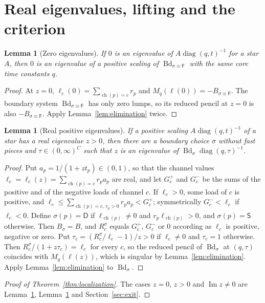 \documentclass[11pt,a4paper]{article}
\theoremstyle{plain}
\newtheorem{lemma}[theorem]{Lemma}
\theoremstyle{definition}
\theoremstyle{remark}
\newcommand{\Imag}{\operatorname{Im}}
\newcommand{\diag}{\operatorname{diag}}
\newcommand{\Bd}{\operatorname{Bd}}
\newcommand{\ch}{\operatorname{ch}}
\newcommand{\rF}{\mathsf{F}}
\newcommand{\rS}{\mathsf{S}}
\newcommand{\rD}{\mathsf{D}}
\begin{document}
\section{Real eigenvalues, lifting and the criterion}\label{sec:proofs}

\begin{lemma}[Zero eigenvalues]\label{lem:zero}
If $0$ is an eigenvalue of $A\diag(q,t)^{-1}$ for a star $A$, then $0$ is an eigenvalue of a
positive scaling of $\Bd_{\sigma\equiv\rF}$ with the same core time constants $q$.
\end{lemma}

\begin{proof}
At $z=0$, $\ell_c(0)=\sum_{\ch(p)=c}r_p$ and $M_q(\ell(0))=-B_{\sigma\equiv\rF}$. The
boundary system $\Bd_{\sigma\equiv\rF}$ has only zero lumps, so its reduced pencil at $z=0$ is
also $-B_{\sigma\equiv\rF}$. Apply Lemma~\ref{lem:elimination} twice.
\end{proof}

\begin{lemma}[Real positive eigenvalues]\label{lem:real}
If a positive scaling $A\diag(q,t)^{-1}$ of a star has a real eigenvalue $z>0$, then there
are a boundary choice $\sigma$ without fast pieces and $\tau\in(0,\infty)^C$ such that $z$ is
an eigenvalue of $\Bd_\sigma\diag(q,\tau)^{-1}$.
\end{lemma}

\begin{proof}
Put $a_p=1/(1+zt_p)\in(0,1)$, so that the channel values
$\ell_c=\ell_c(z)=\sum_{\ch(p)=c}r_pa_p$ are real, and let $G^+_c$ and $G^-_c$ be the sums of
the positive and of the negative loads of channel $c$. If $\ell_c>0$, some load of $c$ is
positive, and $\ell_c\le\sum_{\ch(p)=c,\,r_p>0}r_pa_p<G^+_c$; symmetrically $G^-_c<\ell_c$ if
$\ell_c<0$. Define $\sigma(p)=\rD$ if $\ell_{\ch(p)}\ne0$ and $r_p\ell_{\ch(p)}>0$, and
$\sigma(p)=\rS$ otherwise. Then $B_\sigma=B$, and $R^\sigma_c$ equals $G^+_c$, $G^-_c$ or
$0$ according as $\ell_c$ is positive, negative or zero. Put $\tau_c=(R^\sigma_c/\ell_c-1)/z>0$
if $\ell_c\ne0$ and $\tau_c=1$ otherwise. Then $R^\sigma_c/(1+z\tau_c)=\ell_c$ for every $c$,
so the reduced pencil of $\Bd_\sigma$ at $(q,\tau)$ coincides with $M_q(\ell(z))$, which is
singular by Lemma~\ref{lem:elimination}. Apply Lemma~\ref{lem:elimination} to $\Bd_\sigma$.
\end{proof}

\begin{proof}[Proof of Theorem~\ref{thm:localization}]
The cases $z=0$, $z>0$ and $\Imag z\ne0$ are Lemma~\ref{lem:zero}, Lemma~\ref{lem:real} and
Section~\ref{sec:exit}.
\end{proof}
\end{document}
